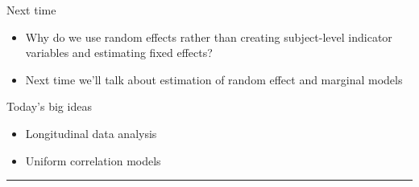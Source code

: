 \documentclass{beamer}
\newcommand{\myitem}{\item[\tiny$\blacksquare$]}
\newcommand{\bi}{\begin{itemize}}
\newcommand{\ei}{\end{itemize}}
\newcommand{\1}{{\mathbf{1}}}
\begin{document}

\begin{frame}{Next time}

\bi
	\myitem Why do we use random effects rather than creating subject-level indicator variables and estimating fixed effects?
	\myitem Next time we'll talk about estimation of random effect and marginal models
\ei

\end{frame}



\begin{frame}{Today's big ideas}

\bi
	\myitem Longitudinal data analysis
	\myitem Uniform correlation models
\ei

\vspace{.75cm}
\hrule
\vspace{.75cm}

\end{frame}


\end{document}

